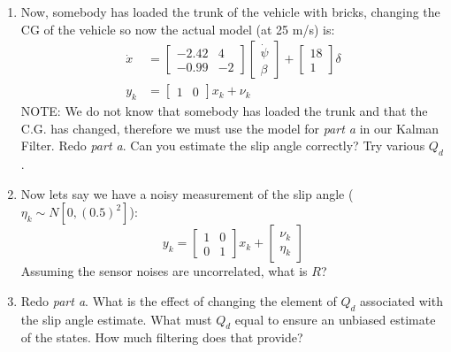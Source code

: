 \documentclass[10pt]{article}
\begin{document}
\begin{enumerate}[label=\textbf{\arabic*.}]
\begin{enumerate}
    \item Now, somebody has loaded the trunk of the vehicle with bricks, 
    changing the CG of the vehicle so now the actual model (at 25 m/s) is:
    \begin{equation*}
      \begin{split}
        \dot{x} &= 
        \begin{bmatrix}
          -2.42 & 4 \\ -0.99 & -2
        \end{bmatrix}
        \begin{bmatrix}
          \dot{\psi} \\ \beta
        \end{bmatrix} 
        +
        \begin{bmatrix}
          18 \\ 1
        \end{bmatrix}
        \delta \\
        y_k &= 
        \begin{bmatrix}
          1 & 0
        \end{bmatrix}
        x_k + \nu_k
      \end{split}
    \end{equation*}
    NOTE: We do not know that somebody has loaded the trunk and that the C.G.
    has changed, therefore we must use the model for \emph{part a} in our Kalman 
    Filter. Redo \emph{part a}. Can you estimate the slip angle correctly? Try 
    various $Q_d$.

    \item Now lets say we have a noisy measurement of the slip angle ($\eta_k 
    \sim N[0,(0.5)^2]$):
    \begin{equation*}
      y_k = 
      \begin{bmatrix}
        1 & 0 \\ 0 & 1
      \end{bmatrix}
      x_k + 
      \begin{bmatrix}
        \nu_k \\ \eta_k
      \end{bmatrix}
    \end{equation*}
    Assuming the sensor noises are uncorrelated, what is $R$?

    \item Redo \emph{part a}. What is the effect of changing the element of 
    $Q_d$ associated with the slip angle estimate. What must $Q_d$ equal to 
    ensure an unbiased estimate of the states. How much filtering does that 
    provide?
  \end{enumerate}
  \vspace{10pt}


\end{enumerate}
\end{document}
